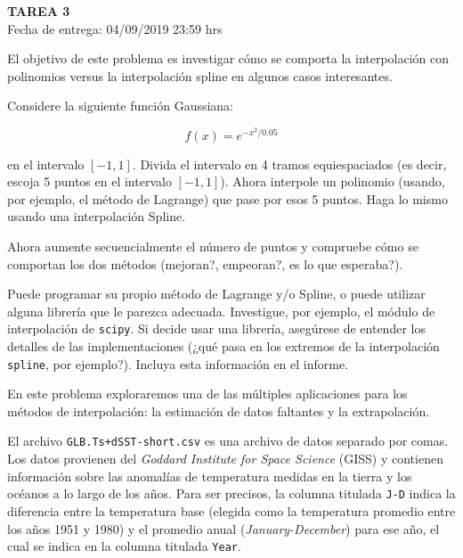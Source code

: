 \documentclass[letter, 11pt]{article}
\newcommand{\tareanro}{3}
\newcommand{\fechaentrega}{04/09/2019 23:59 hrs}
\begin{document}
\thispagestyle{firstpage}

\begin{center}
  {\uppercase{\LARGE \bf Tarea \tareanro}}\\
  Fecha de entrega: \fechaentrega
\end{center}



El objetivo de este problema es investigar cómo se comporta la interpolación
con polinomios versus la interpolación spline en algunos casos interesantes.

Considere la siguiente función Gaussiana:

$$ f(x) = e^{-x^2/0.05}$$

\noindent en el intervalo $[-1, 1]$. Divida el intervalo en 4 tramos
equiespaciados (es decir, escoja 5 puntos en el intervalo $[-1, 1]$). Ahora
interpole un polinomio (usando, por ejemplo, el método de Lagrange) que pase
por esos 5 puntos. Haga lo mismo usando una interpolación Spline.

Ahora aumente secuencialmente el número de puntos y compruebe cómo se comportan
los dos métodos (mejoran?, empeoran?, es lo que esperaba?).

\begin{ayuda}

  Puede programar su propio método de Lagrange y/o Spline, o puede utilizar
  alguna librería que le parezca adecuada. Investigue, por ejemplo, el módulo
  de interpolación de \texttt{scipy}. Si decide usar una librería, asegúrese de
  entender los detalles de las implementaciones (¿qué pasa en los extremos de
  la interpolación \texttt{spline}, por ejemplo?). Incluya esta información en
  el informe.
\end{ayuda}


\vspace{1em}

En este problema exploraremos una de las múltiples aplicaciones para los
métodos de interpolación: la estimación de datos faltantes y la extrapolación.

El archivo \texttt{GLB.Ts+dSST-short.csv} es una archivo de datos separado por
comas. Los datos provienen del \emph{Goddard Institute for Space Science}
(GISS) y contienen información sobre las anomalías de temperatura medidas en la
tierra y los océanos a lo largo de los años. Para ser precisos, la columna
titulada \texttt{J-D} indica la diferencia entre la temperatura base (elegida
como la temperatura promedio entre los años 1951 y 1980) y el promedio
anual (\emph{January-December}) para ese año, el cual se indica en la columna
titulada \texttt{Year}.
\end{document}
